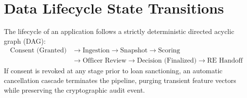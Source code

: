 \section{Data Lifecycle State Transitions}
The lifecycle of an application follows a strictly deterministic directed acyclic graph (DAG):
\begin{equation*}
  \begin{aligned}
    \text{Consent (Granted)} &\longrightarrow \text{Ingestion} \longrightarrow \text{Snapshot} \longrightarrow \text{Scoring} \\
    &\longrightarrow \text{Officer Review} \longrightarrow \text{Decision (Finalized)} \longrightarrow \text{RE Handoff}
  \end{aligned}
\end{equation*}
If consent is revoked at any stage prior to loan sanctioning, an automatic cancellation cascade terminates the pipeline, purging transient feature vectors while preserving the cryptographic audit event.
